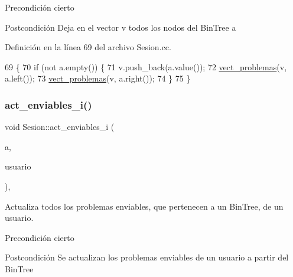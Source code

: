 \begin{DoxyPrecond}{Precondición}
cierto 
\end{DoxyPrecond}
\begin{DoxyPostcond}{Postcondición}
Deja en el vector v todos los nodos del Bin\+Tree a 
\end{DoxyPostcond}


Definición en la línea 69 del archivo Sesion.\+cc.


\begin{DoxyCode}
69                                                                              \{
70         \textcolor{keywordflow}{if} (not a.empty()) \{
71           v.push\_back(a.value());
72           \mbox{\hyperlink{class_sesion_a9ed9478b2d860d8d713e19823febeaf3}{vect\_problemas}}(v, a.left());
73           \mbox{\hyperlink{class_sesion_a9ed9478b2d860d8d713e19823febeaf3}{vect\_problemas}}(v, a.right());
74         \}
75       \}
\end{DoxyCode}
\mbox{\label{class_sesion_ad391d505577569f30635f19a0f36c9a0}} 
\subsubsection{\texorpdfstring{act\+\_\+enviables\+\_\+i()}{act\_enviables\_i()}}
{\footnotesize\ttfamily void Sesion\+::act\+\_\+enviables\+\_\+i (\begin{DoxyParamCaption}\item[{const Bin\+Tree$<$ string $>$ \&}]{a,  }\item[{\mbox{\hyperlink{class_usuario}{Usuario}} \&}]{usuario }\end{DoxyParamCaption})\hspace{0.3cm}{\ttfamily [static]}, {\ttfamily [private]}}



Actualiza todos los problemas enviables, que pertenecen a un Bin\+Tree, de un usuario. 

\begin{DoxyPrecond}{Precondición}
cierto 
\end{DoxyPrecond}
\begin{DoxyPostcond}{Postcondición}
Se actualizan los problemas enviables de un usuario a partir del Bin\+Tree 
\end{DoxyPostcond}


